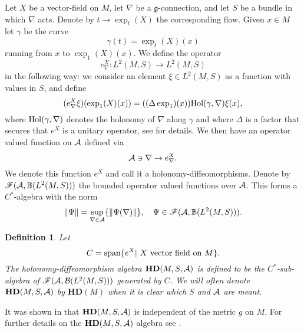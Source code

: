 \documentclass[letterpaper,11pt]{article}
\newcommand{\nn}{\nonumber}
\def\ca{{\cal A}}
\def\cb{{\cal B}}
\def\cd{{\cal D}}
\def\ch{{\cal H}}
\newtheorem{definition}[thm]{Definition}
\begin{document}
Let $X$ be a vector-field on $M$,  let $\nabla$ be a $\mathfrak{g}$-connection, and let $S$ be a bundle in which $\nabla $ acts.  Denote by $t\to \exp_t(X)$ the corresponding flow. Given $x\in M$ let $\gamma$ be the curve  
$$\gamma (t)=\exp_{t} (X) (x) $$
running from $x$ to $\exp_1 (X)(x)$. We define the operator 
$$e^X_\nabla :L^2 (M , S) \to L^2 (M ,  S )$$
in the following way:
we consider an element $\xi \in L^2 (M ,  S)$ as a function with values in $S$, and define 
\begin{equation}
  (e^X_\nabla \xi )(\exp_1(X) (x))=  ((\Delta \exp_1) (x))  \hbox{Hol}(\gamma, \nabla) \xi (x)   ,
  \label{chopin1}
 \end{equation}
where $\hbox{Hol}(\gamma, \nabla)$ denotes the holonomy of $\nabla$ along $\gamma$ and where $\Delta$ is a factor that secures that $e^X$ is a unitary operator, see \cite{AGnew} for details. %
%
We then have an operator valued function on $\ca$ defined via 
\begin{equation}
\ca \ni \nabla \to e^X_\nabla  . 
\nn
\end{equation}
We denote this function $e^X$ and call it a holonomy-diffeomorphisms. 
Denote by $\mathscr{F} (\ca , \mathbb{B} (L^2(M, S) ))$ the bounded operator valued functions over $\ca$. This forms a $C^*$-algebra with the norm
$$\| \Psi \| =  \sup_{\nabla \in \ca} \{\|  \Psi (\nabla )\| \}, \quad \Psi \in  \mathscr{F} (\ca , \mathbb{B} (L^2(M, S )) ). $$ 
    
  


\begin{definition}
Let 
$$C =   \hbox{span} \{ e^X | \ X \hbox{ vector field on  } M\}  . $$
The holonomy-diffeomorphism algebra $\mathbf{H D} (M,S,\ca)   $ is defined to be the $C^*$-sub-algebra of  $\mathscr{F} (\ca , \cb (L^2(M,S )) )$ generated by $C$.
We will often denote $\mathbf{H D} (M,S,\ca)   $ by  $\mathbf{H D}  (M)$ when it is clear which $S$ and $\ca$ are meant.
\end{definition}

It was shown in \cite{AGnew} that  $\mathbf{H D} (M,S,\ca)   $ is independent of the metric $g$ on $M$. For further details on the $\mathbf{H D} (M,S,\ca)   $ algebra see \cite{Aastrup:2014ppa}. 
\end{document}
